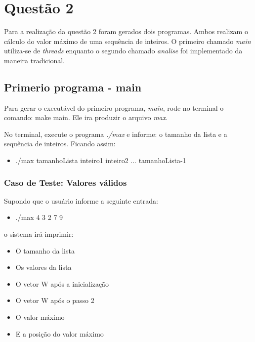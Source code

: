 \section{Questão 2}

  Para a realização da questão 2 foram gerados dois programas. Ambos realizam o cálculo do valor máximo de uma sequência de inteiros. O primeiro chamado \textit{main} utiliza-se de \textit{threads} enquanto o segundo chamado \textit{analise} foi implementado da maneira tradicional.


\subsection{Primerio programa - main}

  Para gerar o executável do primeiro programa, \textit{main}, rode no terminal o comando: make main. Ele ira produzir o arquivo \textit{max}.

  No terminal, execute o programa \textit{./max} e informe: o tamanho da lista e a sequência de inteiros. Ficando assim:

  \begin{itemize}
    \item ./max tamanhoLista inteiro1 inteiro2 ... tamanhoLista-1
  \end{itemize}

  \subsubsection{Caso de Teste: Valores válidos}

    Supondo que o usuário informe a seguinte entrada:

    \begin{itemize}
      \item ./max 4 3 2 7 9
    \end{itemize}

    o sistema irá imprimir:

    \begin{itemize}
      \item O tamanho da lista
      \item Os valores da lista
      \item O vetor W após a inicialização
      \item O vetor W após o passo 2
      \item O valor máximo
      \item E a posição do valor máximo
    \end{itemize}

